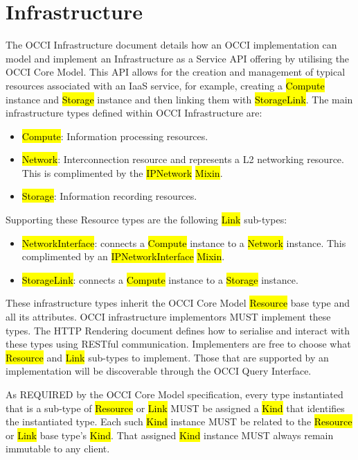 \documentclass[10pt,a4paper]{article}
\begin{document}

\section{Infrastructure}
The OCCI Infrastructure document details how an OCCI implementation can model and implement an
Infrastructure as a Service API offering by utilising the OCCI Core Model. This API allows for the creation and management of typical resources associated with an IaaS service, for example, creating a \hl{Compute} instance and \hl{Storage} instance and then linking them with \hl{StorageLink}. The main infrastructure types defined within OCCI Infrastructure are:

\begin{itemize}
	\item \hl{Compute}: Information processing resources.
	\item \hl{Network}: Interconnection resource and represents a L2 networking resource. 
	This is complimented by the \hl{IPNetwork} \hl{Mixin}.
	\item \hl{Storage}: Information recording resources.
\end{itemize}

Supporting these Resource types are the following \hl{Link} sub-types:

\begin{itemize}
	\item \hl{NetworkInterface}: connects a \hl{Compute} instance to a \hl{Network} instance. 
	This complimented by an \hl{IPNetworkInterface} \hl{Mixin}.
	\item \hl{StorageLink}: connects a \hl{Compute} instance to a \hl{Storage} instance.
\end{itemize}

These infrastructure types inherit the OCCI Core Model \hl{Resource} base type and all its 
attributes. OCCI infrastructure implementors MUST implement these types. The HTTP 
Rendering document defines how to serialise and interact with these types 
using RESTful communication. Implementers are free to choose what \hl{Resource} and 
\hl{Link} sub-types to implement. Those that are supported by an implementation will be 
discoverable through the OCCI Query Interface.

As REQUIRED by the OCCI Core Model specification, every type instantiated that is 
a sub-type of \hl{Resource} or \hl{Link} MUST be assigned a \hl{Kind} that identifies the instantiated 
type. Each such \hl{Kind} instance MUST be related to the \hl{Resource} or \hl{Link} base type's \hl{Kind}. 
That assigned \hl{Kind} instance MUST always remain immutable to any client.
\end{document}
